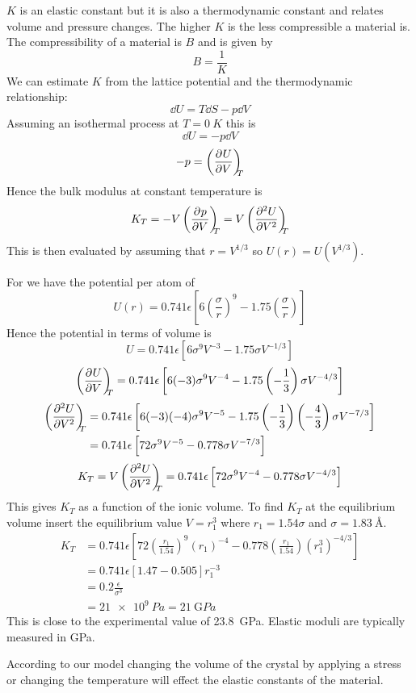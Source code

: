     \(K\) is an elastic constant but it is also a thermodynamic constant and relates volume and pressure changes.
    The higher \(K\) is the less compressible a material is.
    The compressibility of a material is \(B\) and is given by
    \[B = \frac{1}{K}\]
    We can estimate \(K\)  from the lattice potential and the thermodynamic relationship:
    \[\dd U = T\dd S - p\dd V\]
    Assuming an isothermal process at \(T = \SI{0}{K}\) this is
    \[\dd U = -p\dd V\]
    \[-p = \left(\pdv[]{U}{V}\right)_{\!\!\!{T}}\]
    Hence the bulk modulus at constant temperature is
    \[K_T = -V\left(\pdv[]{p}{V}\right)_{\!\!\!{T}} = V\left(\pdv[2]{U}{V}\right)_{\!\!\!{T}}\]
    This is then evaluated by assuming that \(r = V^{1/3}\) so \(U(r) = U(V^{1/3})\).
    
    \example
    For  we have the potential per atom of
    \[U(r) = 0.741\epsilon\left[6\left(\frac{\sigma}{r}\right)^9 - 1.75\left(\frac{\sigma}{r}\right)\right]\]
    Hence the potential in terms of volume is
    \[U = 0.741\epsilon\left[6\sigma^9V^{-3} - 1.75\sigma V^{-1/3}\right]\]
    \[\left(\pdv[]{U}{V}\right)_{\!\!\!{T}} = 0.741\epsilon\left[6(-3)\sigma^9V^{-4} - 1.75\left(-\frac{1}{3}\right)\sigma V^{-4/3}\right]\]
    \begin{align*}
        \left(\pdv[2]{U}{V}\right)_{\!\!\!{T}} &= 0.741\epsilon\left[6(-3)(-4)\sigma^9 V^{-5} - 1.75\left(-\frac{1}{3}\right)\left(-\frac{4}{3}\right)\sigma V^{-7/3}\right]\\
        &= 0.741\epsilon\left[72\sigma^9 V^{-5} - 0.778\sigma V^{-7/3}\right]
    \end{align*}
    \[K_T = V\left(\pdv[2]{U}{V}\right)_{\!\!\!{T}} = 0.741\epsilon\left[72\sigma^9 V^{-4} - 0.778\sigma V^{-4/3}\right]\]
    This gives \(K_T\) as a function of the ionic volume.
    To find \(K_T\) at the equilibrium volume insert the equilibrium value \(V = r_1^3\) where \(r_1 = 1.54\sigma\) and \(\sigma = \SI{1.83}{\angstrom}\).
    \begin{align*}
        K_T &= 0.741\epsilon\left[72\left(\frac{r_1}{1.54}\right)^9\left(r_1\right)^{-4} - 0.778\left(\frac{r_1}{1.54}\right)\left(r_1^3\right)^{-4/3}\right]\\
        &= 0.741\epsilon[1.47 - 0.505]r_1^{-3}\\
        &= 0.2\frac{\epsilon}{\sigma^3}\\
        &= \SI{21e9}{Pa} = \SI{21}{\giga Pa}
    \end{align*}
    This is close to the experimental value of \SI{23.8}{\giga Pa}.
    Elastic moduli are typically measured in \si{\giga Pa}.
    
    According to our model changing the volume of the crystal by applying a stress or changing the temperature will effect the elastic constants of the material.
    
